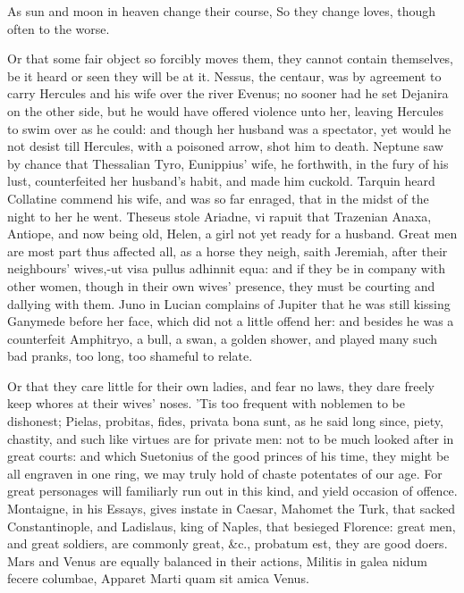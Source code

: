 {As sun and moon in heaven change their course,
So they change loves, though often to the worse.

Or that some fair object so forcibly moves them, they cannot contain
themselves, be it heard or seen they will be at it. Nessus, the
centaur, was by agreement to carry Hercules and his wife over the river
Evenus; no sooner had he set Dejanira on the other side, but he would
have offered violence unto her, leaving Hercules to swim over as he
could: and though her husband was a spectator, yet would he not desist
till Hercules, with a poisoned arrow, shot him to death. Neptune
saw by chance that Thessalian Tyro, Eunippius' wife, he forthwith, in
the fury of his lust, counterfeited her husband's habit, and made him
cuckold. Tarquin heard Collatine commend his wife, and was so far
enraged, that in the midst of the night to her he went. Theseus
stole Ariadne, vi rapuit that Trazenian Anaxa, Antiope, and now being
old, Helen, a girl not yet ready for a husband. Great men are most part
thus affected all, as a horse they neigh, saith Jeremiah, after
their neighbours' wives,-ut visa pullus adhinnit equa: and if they be
in company with other women, though in their own wives' presence, they
must be courting and dallying with them. Juno in Lucian complains of
Jupiter that he was still kissing Ganymede before her face, which did
not a little offend her: and besides he was a counterfeit Amphitryo, a
bull, a swan, a golden shower, and played many such bad pranks, too
long, too shameful to relate.

Or that they care little for their own ladies, and fear no laws, they
dare freely keep whores at their wives' noses. 'Tis too frequent with
noblemen to be dishonest; Pielas, probitas, fides, privata bona sunt,
as he said long since, piety, chastity, and such like virtues are
for private men: not to be much looked after in great courts: and which
Suetonius of the good princes of his time, they might be all engraven
in one ring, we may truly hold of chaste potentates of our age. For
great personages will familiarly run out in this kind, and yield
occasion of offence.  Montaigne, in his Essays, gives instate in
Caesar, Mahomet the Turk, that sacked Constantinople, and Ladislaus,
king of Naples, that besieged Florence: great men, and great soldiers,
are commonly great, \&c., probatum est, they are good doers. Mars and
Venus are equally balanced in their actions,
Militis in galea nidum fecere columbae,
Apparet Marti quam sit amica Venus.

}
